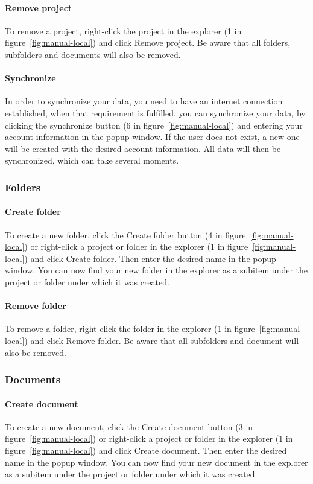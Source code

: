 	\paragraph{Remove project}
	To remove a project, right-click the project in the explorer (1 in figure~\ref{fig:manual-local}) and click Remove project. Be aware that all folders, subfolders and documents will also be removed.

	\paragraph{Synchronize}
	In order to synchronize your data, you need to have an internet connection established, when that requirement is fulfilled, you can synchronize your data, by clicking the synchronize button (6 in figure~\ref{fig:manual-local}) and entering your account information in the popup window. If the user does not exist, a new one will be created with the desired account information. All data will then be synchronized, which can take several moments.

\subsubsection{Folders}

	\paragraph{Create folder}
	To create a new folder, click the Create folder button (4 in figure~\ref{fig:manual-local}) or right-click a project or folder in the explorer (1 in figure~\ref{fig:manual-local}) and click Create folder. Then enter the desired name in the popup window. You can now find your new folder in the explorer as a subitem under the project or folder under which it was created.

	\paragraph{Remove folder}
	To remove a folder, right-click the folder in the explorer (1 in figure~\ref{fig:manual-local}) and click Remove folder. Be aware that all subfolders and document will also be removed.

\subsubsection{Documents}

	\paragraph{Create document}
	To create a new document, click the Create document button (3 in figure~\ref{fig:manual-local}) or right-click a project or folder in the explorer (1 in figure~\ref{fig:manual-local}) and click Create document. Then enter the desired name in the popup window. You can now find your new document in the explorer as a subitem under the project or folder under which it was created.
	
